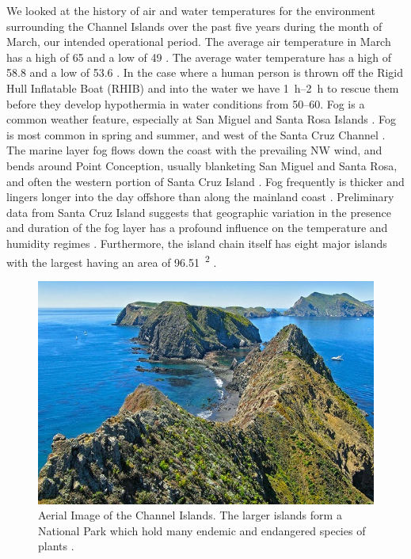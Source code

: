 \documentclass{wrcecapstone}
\begin{document}
We looked at the history of air and water temperatures for the environment surrounding the Channel Islands over the past five years during the month of March, our intended operational period. The average air temperature in March has a high of \SI{65}{\fahrenheit} and a low of \SI{49}{\fahrenheit} \cite{accuweather2019channel}. The average water temperature has a high of \SI{58.8}{\fahrenheit} and a low of \SI{53.6}{\fahrenheit} \cite{accuweather2019channel}. In the case where a human person is thrown off the Rigid Hull Inflatable Boat (RHIB) and into the water we have \SIrange{1}{2}{\hour} to rescue them before they develop hypothermia in water conditions from \SIrange{50}{60}{\fahrenheit}. Fog is a common weather feature, especially at San Miguel and Santa Rosa Islands \cite{nps2019weather}. Fog is most common in spring and summer, and west of the Santa Cruz Channel \cite{nps2019weather}. The marine layer fog flows down the coast with the prevailing NW wind, and bends around Point Conception, usually blanketing San Miguel and Santa Rosa, and often the western portion of Santa Cruz Island \cite{nps2019weather}. Fog frequently is thicker and lingers longer into the day offshore than along the mainland coast \cite{nps2019weather}. Preliminary data from Santa Cruz Island suggests that geographic variation in the presence and duration of the fog layer has a profound influence on the temperature and humidity regimes \cite{nps2019weather}. Furthermore, the island chain itself has eight major islands with the largest having an area of \SI{96.51}{\mile\squared} \cite{nps2019weather}. 
\begin{figure}
\begin{center}
\includegraphics[width=0.8\columnwidth]{figures/fig3-channel.png}
\end{center}
\caption{Aerial Image of the Channel Islands. The larger islands form a National Park which hold many endemic and endangered species of plants \cite{nps2019webpage}.}
\label{fig:1.2.1}
\end{figure}
\end{document}
